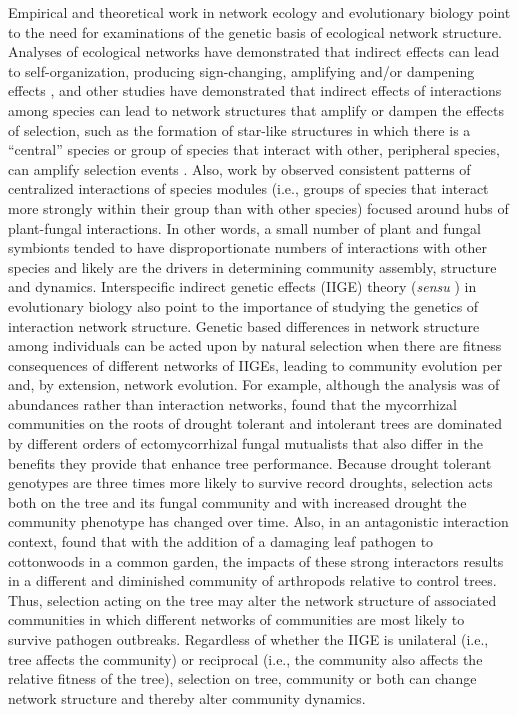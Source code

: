 \documentclass[fleqn,12pt]{olplainarticle}
\begin{document}
Empirical and theoretical work in network ecology and evolutionary
biology point to the need for examinations of the genetic basis of
ecological network structure. Analyses of ecological networks have
demonstrated that indirect effects can lead to self-organization,
producing sign-changing, amplifying and/or dampening effects
\citep{Newman2006, Sole2006Self-OrganizationEcosystems}, and other
studies have demonstrated that indirect effects of interactions among
species can lead to network structures that amplify or dampen the
effects of selection, such as the formation of star-like structures in
which there is a ``central'' species or group of species that interact
with other, peripheral species, can amplify selection events
\citep{Lieberman2005EvolutionaryGraphs}. Also, work by
\cite{Toju2014a, Toju2016, Toju2017} observed consistent patterns of
centralized interactions of species modules (i.e., groups of species
that interact more strongly within their group than with other
species) focused around hubs of plant-fungal interactions. In other
words, a small number of plant and fungal symbionts tended to have
disproportionate numbers of interactions with other species and likely
are the drivers in determining community assembly, structure and
dynamics.  Interspecific indirect genetic effects (IIGE) theory
(\textit{sensu} \cite{Shuster2006COMMUNITYSTRUCTURE}) in evolutionary
biology also point to the importance of studying the genetics of
interaction network structure. Genetic based differences in network
structure among individuals can be acted upon by natural selection
when there are fitness consequences of different networks of IIGEs,
leading to community evolution per
\cite{Whitham2020IntraspecificEvolution} and, by extension, network
evolution. For example, although the analysis was of abundances rather
than interaction networks, \cite{Gehring2014PlantChange, Gehring2017a}
found that the mycorrhizal communities on the roots of drought
tolerant and intolerant trees are dominated by different orders of
ectomycorrhizal fungal mutualists that also differ in the benefits
they provide that enhance tree performance. Because drought tolerant
genotypes are three times more likely to survive record droughts,
selection acts both on the tree and its fungal community and with
increased drought the community phenotype has changed over time. Also,
in an antagonistic interaction context, \cite{Busby2015} found that
with the addition of a damaging leaf pathogen to cottonwoods in a
common garden, the impacts of these strong interactors results in a
different and diminished community of arthropods relative to control
trees. Thus, selection acting on the tree may alter the network
structure of associated communities in which different networks of
communities are most likely to survive pathogen outbreaks. Regardless
of whether the IIGE is unilateral (i.e., tree affects the community)
or reciprocal (i.e., the community also affects the relative fitness
of the tree), selection on tree, community or both can change network
structure \citep{Whitham2020IntraspecificEvolution} and thereby alter
community dynamics.
\end{document}
